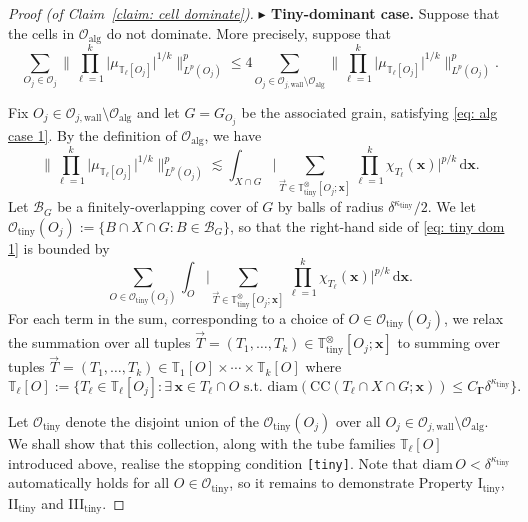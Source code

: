 \documentclass[reqno]{amsart}
\numberwithin{equation}{section}
\newcommand{\T}{\mathbb{T}}
\newcommand{\cB}{\mathcal{B}}
\newcommand{\cO}{\mathcal{O}}
\newcommand{\ud}{\mathrm{d}}
\newcommand{\bx}{\mathbf{x}}
\newcommand{\bdGamma}{\boldsymbol{\Gamma}}
\theoremstyle{plain}
\theoremstyle{definition}
\newcommand{\ttiny}{\mathrm{tiny}}
\newcommand{\alg}{\mathrm{alg}}
\newcommand{\wall}{\mathrm{wall}}
\newcommand{\CC}{\mathrm{CC}}
\newcommand{\diam}{\mathrm{diam}}
\begin{document}
\begin{proof}[Proof (of Claim~\ref{claim: cell dominate})]
\noindent \textbf{$\blacktriangleright$ Tiny-dominant case.} Suppose that the cells in $\cO_{\alg}$ do not dominate. More precisely, suppose that
\begin{equation}\label{eq: tiny dom}
   \sum_{O_j \in \cO_j} \Big\|\prod_{\ell = 1}^k \big| \mu_{\T_{\ell}[O_j]}  \big|^{1/k} \Big\|_{L^p(O_j)}^p \leq 4 \sum_{O_j \in \cO_{j,\wall} \setminus \cO_{\alg}} \Big\|\prod_{\ell = 1}^k \big| \mu_{\T_{\ell}[O_j]} \big|^{1/k} \Big\|_{L^p(O_j)}^p.
\end{equation}

Fix $O_j \in \cO_{j,\wall} \setminus \cO_{\alg}$ and let $G = G_{O_j}$ be the associated grain, satisfying \eqref{eq: alg case 1}. By the definition of $\cO_{\alg}$, we have
\begin{equation}\label{eq: tiny dom 1}
    \Big\|\prod_{\ell = 1}^k \big| \mu_{\T_{\ell}[O_j]}  \big|^{1/k} \Big\|_{L^p(O_j)}^p \lesssim \int_{X \cap G} \Big|\sum_{\vec{T} \in \T^{\otimes}_{\ttiny}[O_j;\bx]}  \prod_{\ell = 1}^k \chi_{T_\ell}(\bx) \Big|^{p/k} \,\ud \bx.
\end{equation}
Let $\cB_G$ be a finitely-overlapping cover of $G$ by balls of radius $\delta^{\kappa_{\ttiny}}/2$. We let $\cO_{\ttiny}(O_j) := \{B \cap X \cap G : B \in \cB_G\}$, so that the right-hand side of \eqref{eq: tiny dom 1} is bounded by 
\begin{equation*}
  \sum_{O \in \cO_{\ttiny}(O_j)} \int_O \Big|\sum_{\vec{T} \in \T^{\otimes}_{\ttiny}[O_j;\bx]}  \prod_{\ell = 1}^k \chi_{T_\ell}(\bx)  \Big|^{p/k} \,\ud \bx.
\end{equation*}
For each term in the sum, corresponding to a choice of $O \in \cO_{\ttiny}(O_j)$, we relax the summation over all tuples $\vec{T} = (T_1, \dots,  T_k) \in \T^{\otimes}_{\ttiny}[O_j;\bx]$ to summing over tuples $\vec{T} = (T_1, \dots,  T_k) \in \T_1[O] \times \cdots \times \T_k[O]$ where
\begin{equation*}
    \T_{\ell}[O] := \Big\{T_{\ell} \in \T_{\ell}[O_j] : \exists\, \bx \in T_{\ell} \cap O \textrm{ s.t. } \diam(\CC(T_{\ell} \cap X \cap  G; \bx)) \leq C_{\bdGamma}\delta^{\kappa_{\ttiny}}\Big\}. 
\end{equation*}

Let $\cO_{\ttiny}$ denote the disjoint union of the $\cO_{\ttiny}(O_j)$ over all $O_j \in \cO_{j,\wall} \setminus \cO_{\alg}$. We shall show that this collection, along with the tube families $\T_{\ell}[O]$ introduced above, realise the stopping condition \texttt{[tiny]}. Note that $\diam\,O < \delta^{\kappa_{\ttiny}}$ automatically holds for all $O \in \cO_{\ttiny}$, so it remains to demonstrate Property I$_{\ttiny}$, II$_{\ttiny}$ and III$_{\ttiny}$.\medskip


\end{proof}
\end{document}
